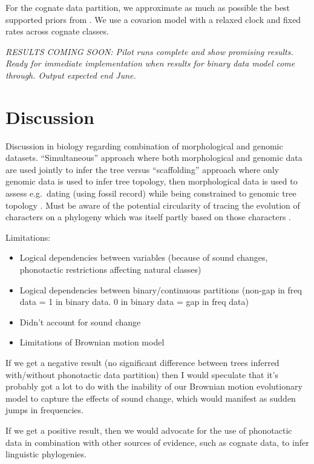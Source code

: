 For the cognate data partition, we approximate as much as possible the best supported priors from \textcite{bouckaert_origin_2018}. We use a covarion model with a relaxed clock and fixed rates across cognate classes.

\emph{RESULTS COMING SOON: Pilot runs complete and show promising results. Ready for immediate implementation when results for binary data model come through. Output expected end June.}

\hypertarget{pn-tree-discussion}{%
\section{Discussion}\label{pn-tree-discussion}}

Discussion in biology regarding combination of morphological and genomic datasets. ``Simultaneous'' approach where both morphological and genomic data are used jointly to infer the tree versus ``scaffolding'' approach where only genomic data is used to infer tree topology, then morphological data is used to assess e.g.~dating (using fossil record) while being constrained to genomic tree topology \autocite{lee_morphological_2015}. Must be aware of the potential circularity of tracing the evolution of characters on a phylogeny which was itself partly based on those characters \autocite{de_queiroz_including_1996}.

Limitations:

\begin{itemize}
\tightlist
\item
  Logical dependencies between variables (because of sound changes, phonotactic restrictions affecting natural classes)
\item
  Logical dependencies between binary/continuous partitions (non-gap in freq data = 1 in binary data. 0 in binary data = gap in freq data)
\item
  Didn't account for sound change
\item
  Limitations of Brownian motion model
\end{itemize}

If we get a negative result (no significant difference between trees inferred with/without phonotactic data partition) then I would speculate that it's probably got a lot to do with the inability of our Brownian motion evolutionary model to capture the effects of sound change, which would manifest as sudden jumps in frequencies.

If we get a positive result, then we would advocate for the use of phonotactic data in combination with other sources of evidence, such as cognate data, to infer linguistic phylogenies.

